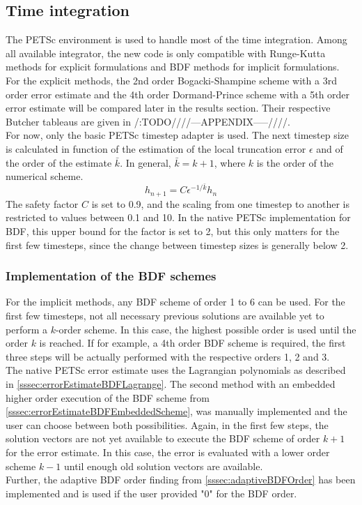 \subsection{Time integration}
The PETSc environment is used to handle most of the time integration. Among all available integrator, the new code is only compatible with Runge-Kutta methods for explicit formulations and BDF methods for implicit formulations. \\
For the explicit methods, the 2nd order Bogacki-Shampine scheme with a 3rd order error estimate and the 4th order Dormand-Prince scheme with a 5th order error estimate will be compared later in the results section. Their respective Butcher tableaus are given in /:TODO////---APPENDIX-----////. \\
For now, only the basic PETSc timestep adapter is used. The next timestep size is calculated in function of the estimation of the local truncation error $\epsilon$ and of the order of the estimate $\bar{k}$. In general, $\bar{k}=k+1$, where $k$ is the order of the numerical scheme. 
\begin{equation}
	h_{n+1} = C\epsilon^{-1/\bar{k}}h_n
\end{equation}
The safety factor $C$ is set to 0.9, and the scaling from one timestep to another is restricted to values between 0.1 and 10. In the native PETSc implementation for BDF, this upper bound for the factor is set to 2, but this only matters for the first few timesteps, since the change between timestep sizes is generally below 2.

\subsubsection{Implementation of the BDF schemes}
For the implicit methods, any BDF scheme of order 1 to 6 can be used. For the first few timesteps, not all necessary previous solutions are available yet to perform a $k$-order scheme. In this case, the highest possible order is used until the order $k$ is reached. If for example, a 4th order BDF scheme is required, the first three steps will be actually performed with the respective orders 1, 2 and 3. \\
The native PETSc error estimate uses the Lagrangian polynomials as described in \autoref{sssec:errorEstimateBDFLagrange}. The second method with an embedded higher order execution of the BDF scheme from \autoref{sssec:errorEstimateBDFEmbeddedScheme}, was manually implemented and the user can choose between both possibilities. Again, in the first few steps, the solution vectors are not yet available to execute the BDF scheme of order $k+1$ for the error estimate. In this case, the error is evaluated with a lower order scheme $k-1$ until enough old solution vectors are available. \\
Further, the adaptive BDF order finding from \autoref{sssec:adaptiveBDFOrder} has been implemented and is used if the user provided "0" for the BDF order. 

